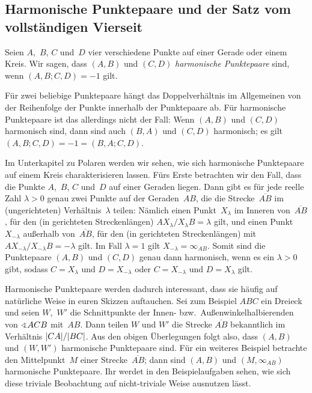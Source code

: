\subsection*{Harmonische Punktepaare und der Satz vom vollständigen Vierseit}
\begin{definition}
	Seien $A$,~$B$, $C$ und~$D$ vier verschiedene Punkte auf einer Gerade oder einem Kreis. Wir sagen, dass $(A,B)$ und $(C,D)$ \emph{harmonische Punktepaare} sind, wenn $(A,B;C,D)=-1$ gilt.
\end{definition}

Für zwei beliebige Punktepaare hängt das Doppelverhältnis im Allgemeinen von der Reihenfolge der Punkte innerhalb der Punktepaare ab. Für harmonische Punktepaare ist das allerdings nicht der Fall: Wenn $(A,B)$ und $(C,D)$ harmonisch sind, dann sind auch $(B,A)$ und $(C,D)$ harmonisch; es gilt $(A,B;C,D)=-1=(B,A;C,D)$.

Im Unterkapitel zu Polaren werden wir sehen, wie sich harmonische Punktepaare auf einem Kreis charakterisieren lassen. Fürs Erste betrachten wir den Fall, dass die Punkte $A$,~$B$, $C$ und~$D$ auf einer Geraden liegen. Dann gibt es für jede reelle Zahl $\lambda>0$ genau zwei Punkte auf der Geraden~$AB$, die die Strecke~$\overline{AB}$ im (ungerichteten) Verhältnis~$\lambda$ teilen: Nämlich einen Punkt~$X_\lambda$ im Inneren von~$\overline{AB}$, für den (in gerichteten Streckenlängen) $AX_{\lambda}/X_{\lambda}B=\lambda$ gilt, und einen Punkt~$X_{-\lambda}$ außerhalb von~$\overline{AB}$, für den (in gerichteten Streckenlängen) mit $AX_{-\lambda}/X_{-\lambda}B=-\lambda$ gilt. Im Fall $\lambda=1$ gilt $X_{-\lambda}=\infty_{AB}$. Somit sind die Punktepaare $(A,B)$ und $(C,D)$ genau dann harmonisch, wenn es ein $\lambda >0$ gibt, sodass $C=X_\lambda$ und $D=X_{-\lambda}$ oder $C=X_{-\lambda}$ und $D=X_\lambda$ gilt.

Harmonische Punktepaare werden dadurch interessant, dass sie häufig auf natürliche Weise in euren Skizzen auftauchen. Sei zum Beispiel $ABC$ ein Dreieck und seien $W$,~$W'$ die Schnittpunkte der Innen- bzw.\ Außenwinkelhalbierenden von $\winkel ACB$ mit~$AB$. Dann teilen $W$ und $W'$ die Strecke $\overline{AB}$ bekanntlich im Verhältnis $\lvert CA\rvert/\lvert BC\rvert$. Aus den obigen Überlegungen folgt also, dass $(A,B)$ und $(W,W')$ harmonische Punktepaare sind. Für ein weiteres Beispiel betrachte den Mittelpunkt~$M$ einer Strecke~$\overline{AB}$; dann sind $(A,B)$ und $(M,\infty_{AB})$ harmonische Punktepaare. Ihr werdet in den Beispielaufgaben sehen, wie sich diese triviale Beobachtung auf nicht-triviale Weise ausnutzen lässt.

